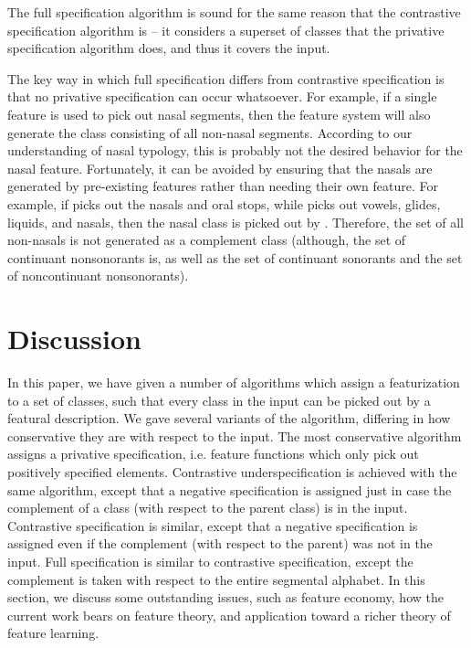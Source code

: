 \documentclass[11pt, oneside]{article}   	%
\begin{document}
\vspace{\baselineskip} \noindent The full specification algorithm is sound for the same reason that the contrastive specification algorithm is -- it considers a superset of classes that the privative specification algorithm does, and thus it covers the input.

\vspace{\baselineskip} The key way in which full specification differs from contrastive specification is that no privative specification can occur whatsoever. For example, if a single feature  is used to pick out nasal segments, then the feature system will also generate the class  consisting of all non-nasal segments. According to our understanding of nasal typology, this is probably not the desired behavior for the nasal feature. Fortunately, it can be avoided by ensuring that the nasals are generated by pre-existing features rather than needing their own feature. For example, if  picks out the nasals and oral stops, while  picks out vowels, glides, liquids, and nasals, then the nasal class is picked out by . Therefore, the set of all non-nasals is not generated as a complement class (although, the set of continuant nonsonorants is, as well as the set of continuant sonorants and the set of noncontinuant nonsonorants).

\section{Discussion}

In this paper, we have given a number of algorithms which assign a featurization to a set of classes, such that every class in the input can be picked out by a featural description. We gave several variants of the algorithm, differing in how conservative they are with respect to the input. The most conservative algorithm assigns a privative specification, i.e. feature functions which only pick out positively specified elements. Contrastive underspecification is achieved with the same algorithm, except that a negative specification is assigned just in case the complement of a class (with respect to the parent class) is in the input. Contrastive specification is similar, except that a negative specification is assigned even if the complement (with respect to the parent) was not in the input. Full specification is similar to contrastive specification, except the complement is taken with respect to the entire segmental alphabet. In this section, we discuss some outstanding issues, such as feature economy, how the current work bears on feature theory, and application toward a richer theory of feature learning.
\end{document}
